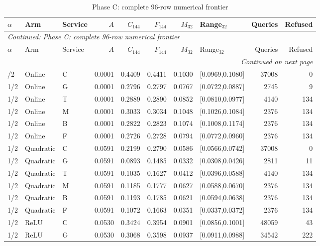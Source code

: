 \begingroup\footnotesize\setlength{\tabcolsep}{3pt}
\begin{longtable}{lllrrrrlrr}
\caption{Phase C: complete 96-row numerical frontier}\label{tab:frontier119c}\\
\toprule
$\alpha$ & Arm & Service & $A$ & $C_{144}$ & $F_{144}$ & $M_{32}$ & Range$_{32}$ & Queries & Refused\\\midrule
\endfirsthead
\multicolumn{10}{l}{\textit{Continued: Phase C: complete 96-row numerical frontier}}\\
\toprule
$\alpha$ & Arm & Service & $A$ & $C_{144}$ & $F_{144}$ & $M_{32}$ & Range$_{32}$ & Queries & Refused\\\midrule
\endhead
\midrule\multicolumn{10}{r}{\textit{Continued on next page}}\\
\endfoot
\bottomrule
\endlastfoot
1/2 & Online & C & 0.0001 & 0.4409 & 0.4411 & 0.1030 & [0.0969,0.1080] & 37008 & 0 \\
1/2 & Online & G & 0.0001 & 0.2796 & 0.2797 & 0.0767 & [0.0722,0.0887] & 2745 & 9 \\
1/2 & Online & T & 0.0001 & 0.2889 & 0.2890 & 0.0852 & [0.0810,0.0977] & 4140 & 134 \\
1/2 & Online & M & 0.0001 & 0.3033 & 0.3034 & 0.1048 & [0.1026,0.1084] & 2376 & 134 \\
1/2 & Online & B & 0.0001 & 0.2822 & 0.2823 & 0.1074 & [0.1008,0.1174] & 2376 & 134 \\
1/2 & Online & F & 0.0001 & 0.2726 & 0.2728 & 0.0794 & [0.0772,0.0960] & 2376 & 134 \\
1/2 & Quadratic & C & 0.0591 & 0.2199 & 0.2790 & 0.0586 & [0.0566,0.0742] & 37008 & 0 \\
1/2 & Quadratic & G & 0.0591 & 0.0893 & 0.1485 & 0.0332 & [0.0308,0.0426] & 2811 & 11 \\
1/2 & Quadratic & T & 0.0591 & 0.1035 & 0.1627 & 0.0412 & [0.0396,0.0588] & 4140 & 134 \\
1/2 & Quadratic & M & 0.0591 & 0.1185 & 0.1777 & 0.0627 & [0.0588,0.0670] & 2376 & 134 \\
1/2 & Quadratic & B & 0.0591 & 0.1193 & 0.1785 & 0.0621 & [0.0594,0.0638] & 2376 & 134 \\
1/2 & Quadratic & F & 0.0591 & 0.1072 & 0.1663 & 0.0351 & [0.0337,0.0372] & 2376 & 134 \\
1/2 & ReLU & C & 0.0530 & 0.3424 & 0.3954 & 0.0901 & [0.0856,0.1001] & 48059 & 43 \\
1/2 & ReLU & G & 0.0530 & 0.3068 & 0.3598 & 0.0937 & [0.0911,0.0988] & 34542 & 222 \\

\end{longtable}
